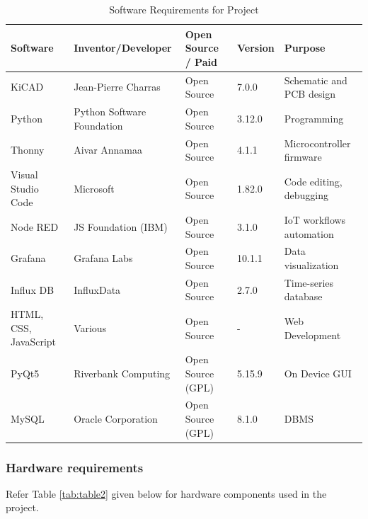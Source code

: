 \documentclass{article}
\begin{document}
\begin{table}[h]
    \centering
    \caption{Software Requirements for Project}
    \begin{tabular}{@{}lll p{1cm} p{4cm}@{}}
        \toprule
        \textbf{Software} & \textbf{Inventor/Developer} & \textbf{Open Source / Paid} & \textbf{Version} & \textbf{Purpose} \\
        \midrule
        KiCAD & Jean-Pierre Charras & Open Source & 7.0.0 & Schematic and PCB design \\
        Python & Python Software Foundation & Open Source & 3.12.0 & Programming \\
        Thonny & Aivar Annamaa & Open Source & 4.1.1 & Microcontroller firmware \\
        Visual Studio Code & Microsoft & Open Source & 1.82.0 & Code editing, debugging \\
        Node RED & JS Foundation (IBM) & Open Source & 3.1.0 & IoT workflows automation \\
        Grafana & Grafana Labs & Open Source & 10.1.1 & Data visualization \\
        Influx DB & InfluxData & Open Source & 2.7.0 & Time-series database \\
        HTML, CSS, JavaScript & Various & Open Source & - & Web Development \\
        PyQt5 & Riverbank Computing & Open Source (GPL) & 5.15.9 & On Device GUI \\
        MySQL & Oracle Corporation & Open Source (GPL) & 8.1.0 & DBMS \\
        \bottomrule
    \end{tabular}
    \label{tab:table1}
\end{table}

\subsubsection{Hardware requirements}\label{hardware-requirements}

Refer Table \ref{tab:table2} given below for hardware components used in
the project.
\end{document}
